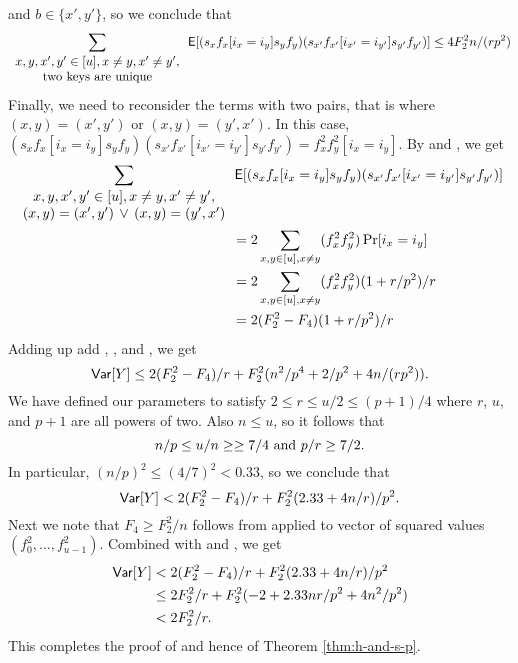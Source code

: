 and $b\in \{x',y'\}$, so we conclude that
\begin{equation}\label{eq:one-pair}
\sum_{\begin{array}{c}x,y,x',y'\in[u], x\neq y, x'\neq y',\\
{\rm two\ keys\ are\ unique}\end{array}}
\operatorname*{\sf{E}}[(s_x f_x[i_x=i_y]s_y f_y)
(s_{x'}f_{x'}[i_{x'}=i_{y'}]s_{y'} f_{y'})]\leq 4 F_2^2 n/(rp^2)
\end{equation}
Finally, we need to reconsider the terms with two pairs, that
is where $(x,y)=(x',y')$ or $(x,y)=(y',x')$. In
this case, $(s_x f_x[i_x=i_y]s_y f_y)
(s_{x'}f_{x'}[i_{x'}=i_{y'}]s_{y'} f_{y'})=f_x^2f_y^2[i_x=i_y]$.
By  and ,  we 
get 
\begin{align}
\sum_{\begin{array}{c}x,y,x',y'\in[u], x\neq y, x'\neq y',\\
(x,y)=(x',y')\,\vee\,(x,y)=(y',x')\end{array}}&
\operatorname*{\sf{E}}[(s_x f_x[i_x=i_y]s_y f_y)
(s_{x'}f_{x'}[i_{x'}=i_{y'}]s_{y'} f_{y'})]\nonumber\\
&=2\sum_{x,y\in[u],x\neq y}(f_x^2f_y^2)\Pr[i_x=i_y]\nonumber\\
&=2\sum_{x,y\in[u],x\neq y}(f_x^2f_y^2)(1+r/p^2)/r\nonumber\\
&=2(F_2^2-F_4)(1+r/p^2)/r\label{eq:two-pairs}
\end{align}
Adding up add , , and
, we get 
\[{\sf Var}[Y]\leq 2(F_2^2-F_4)/r+F_2^2 (n^2/p^4+2/p^2+4 n/(rp^2)).\]
We have defined our parameters to satisfy $2\leq r\leq u/2\leq (p+1)/4$
where $r$, $u$, and $p+1$ are all powers of two. Also $n\leq u$, so it 
follows that
\begin{equation}
n/p\leq u/n\geq\geq 7/4\textnormal{ and }p/r\geq 7/2.\label{eq:ratios}
\end{equation}
In particular, $(n/p)^2\leq(4/7)^2<0.33$, so we conclude
that
\begin{equation}\label{eq:var-good1}
{\sf Var}[Y]<2(F_2^2-F_4)/r+F_2^2 (2.33+4 n/r)/p^2.
\end{equation}
Next we note that $F_4\geq F_2^2/n$ follows from  applied
to vector of squared values $(f_0^2,\ldots,f_{u-1}^2)$. Combined
with  and , we get
\begin{align*}
{\sf Var}[Y]&<2(F_2^2-F_4)/r+F_2^2 (2.33+4 n/r)/p^2\\
&\leq 2F_2^2/r+F_2^2(-2+2.33nr/p^2+4 n^2/p^2)\\
&<2F_2^2/r.
\end{align*}
This completes the proof of   and hence
of Theorem \ref{thm:h-and-s-p}.
